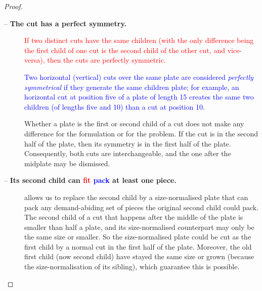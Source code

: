 \documentclass[ppgc,tese,english,formais,babel]{iiufrgs}
\newif\iffinalversion
\newcommand{\newtext}[1]{\iffinalversion%
#1%
\else%
\textcolor{blue}{#1}%
\fi%
}
\newcommand{\oldtext}[1]{\iffinalversion%
\else%
\textcolor{red}{#1}%
\fi%
}
\begin{document}
\begin{proof}
\begin{description}
\item[ -- \textbf{The cut has a perfect symmetry.}]
\oldtext{If two distinct cuts have the same children (with the only difference being the first child of one cut is the second child of the other cut, and vice-versa), then the cuts are perfectly symmetric.}
\newtext{Two horizontal (vertical) cuts over the same plate are considered \emph{perfectly symmetrical} if they generate the same children plate; for example, an horizontal cut at position five of a plate of length 15 creates the same two children (of lengths five and 10) than a cut at position 10.}
Whether a plate is the first or second child of a cut does not make any difference for the formulation or for the problem.
If the cut is in the second half of the plate, then its symmetry is in the first half of the plate.
Consequently, both cuts are interchangeable, and the one after the midplate may be dismissed.
\item[ -- \textbf{Its second child can \oldtext{fit}\newtext{pack} at least one piece.}]
 allows us to replace the second child by a size-normalised plate that can pack any demand-abiding set of pieces the original second child could pack.
The second child of a cut that happens after the middle of the plate is smaller than half a plate, and its size-normalised counterpart may only be the same size or smaller.
So the size-normalised plate could be cut as the first child by a normal cut in the first half of the plate.
Moreover, the old first child (now second child) have stayed the same size or grown (because the size-normalisation of its sibling), which guarantee this is possible.


\end{description}
\end{proof}
\end{document}
